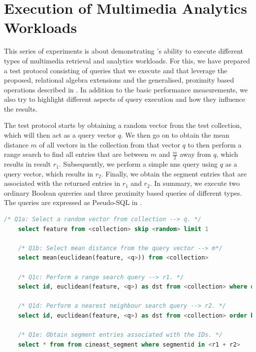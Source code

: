 \section{Execution of Multimedia Analytics Workloads}
\label{section:evaluation_analytics}

This series of experiments is about demonstrating \cottontail{}'s ability to execute different types of multimedia retrieval and analytics workloads. For this, we have prepared a test protocol consisting of queries that we execute and that leverage the proposed, relational algebra extensions and the generalised, proximity based operations described in . In addition to the basic performance measurements, we also try to highlight different aspects of query execution and how they influence the results.

The test protocol starts by obtaining a random vector from the test collection, which will then act as a query vector $q$. We then go on to obtain the mean distance $m$ of all vectors in the collection from that vector $q$ to then perform a range search to find all entries that are between $m$ and $\frac{m}{2}$ away from $q$, which results in result $r_1{}$. Subsequently, we perform a simple \acrshort{nns} query using $q$ as a query vector, which results in $r_2$. Finally, we obtain the segment entries that are associated with the returned entries in $r_1$ and $r_2$. In summary, we execute two ordinary Boolean qureries and three proximity based queries of different types. The queries are expressed as Pseudo-SQL in .

\begin{lstlisting}[language=SQL, caption={Pseudo-SQL of the queries executed for the analytics workload.}, label=listing:analytics_queries, numbers=none]
    /* Q1a: Select a random vector from collection --> q. */
    select feature from <collection> skip <random> limit 1
    
    /* Q1b: Select mean distance from the query vector --> m*/
    select mean(euclidean(feature, <q>)) from <collection> 

    /* Q1c: Perform a range search query --> r1. */
    select id, euclidean(feature, <q>) as dst from <collection> where dst BETWEEN (m/2.0, m) order by dst asc limit 1000

    /* Q1d: Perform a nearest neighbour search query --> r2. */
    select id, euclidean(feature, <q>) as dst from <collection> order by dst asc limit 1000

    /* Q1e: Obtain segment entries associated with the IDs. */
    select * from from cineast_segment where segmentid in <r1 + r2>
\end{lstlisting}

